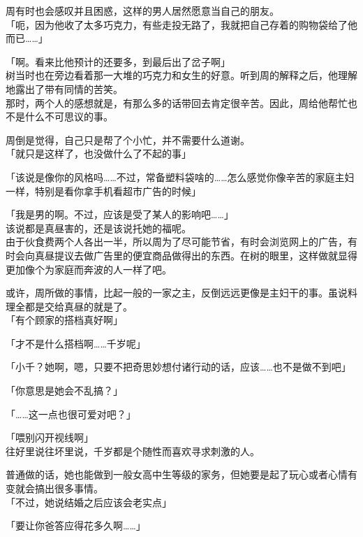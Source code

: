 周有时也会感叹并且困惑，这样的男人居然愿意当自己的朋友。\\

「呃，因为他收了太多巧克力，有些走投无路了，我就把自己存着的购物袋给了他而已……」

「啊。看来比他预计的还要多，到最后出了岔子啊」\\

树当时也在旁边看着那一大堆的巧克力和女生的好意。听到周的解释之后，他理解地露出了带有同情的苦笑。\\

那时，两个人的感想就是，有那么多的话带回去肯定很辛苦。因此，周给他帮忙也不是什么不可思议的事。

周倒是觉得，自己只是帮了个小忙，并不需要什么道谢。\\

「就只是这样了，也没做什么了不起的事」

「该说是像你的风格吗……不过，常备塑料袋啥的……怎么感觉你像辛苦的家庭主妇一样，特别是看你拿手机看超市广告的时候」

「我是男的啊。不过，应该是受了某人的影响吧……」\\

该说都是真昼害的，还是该说托她的福呢。\\

由于伙食费两个人各出一半，所以周为了尽可能节省，有时会浏览网上的广告，有时会向真昼提议去做广告里的便宜商品做得出的东西。在树的眼里，这样做就显得更加像个为家庭而奔波的人一样了吧。

或许，周所做的事情，比起一般的一家之主，反倒远远更像是主妇干的事。虽说料理全都是交给真昼的就是了。\\

「有个顾家的搭档真好啊」

「才不是什么搭档啊……千岁呢」

「小千？她啊，嗯，只要不把奇思妙想付诸行动的话，应该……也不是做不到吧」

「你意思是她会不乱搞？」

「……这一点也很可爱对吧？」

「喂别闪开视线啊」\\

往好里说往坏里说，千岁都是个随性而喜欢寻求刺激的人。

普通做的话，她也能做到一般女高中生等级的家务，但她要是起了玩心或者心情有变就会搞出很多事情。\\

「不过，她说结婚之后应该会老实点」

「要让你爸答应得花多久啊……」\\


